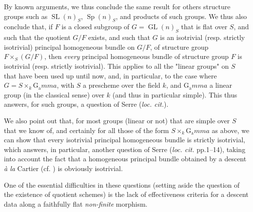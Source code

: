 By known arguments, we thus conclude the same result for others structure groups such as $\operatorname{SL}(n)_S$, $\operatorname{Sp}(n)_S$, and products of such groups.
We thus also conclude that, if $F$ is a closed subgroup of $G=\operatorname{GL}(n)_S$ that is flat over $S$, and such that the quotient $G/F$ exists, and such that $G$ is an isotrivial (resp. strictly isotrivial) principal homogeneous bundle on $G/F$, of structure group $F\times_S(G/F)$, then \emph{every} principal homogeneous bundle of structure group $F$ is isotrivial (resp. strictly isotrivial).
This applies to all the "linear groups" on $S$ that have been used up until now, and, in particular, to the case where $G=S\times_k\operatorname{G_a}mma$, with $S$ a prescheme over the field $k$, and $\operatorname{G_a}mma$ a linear group (in the classical sense) over $k$ (and thus in particular simple).
This thus answers, for such groups, a question of Serre (\emph{loc. cit.}).

We also point out that, for most groups (linear or not) that are simple over $S$ that we know of, and certainly for all those of the form $S\times_k\operatorname{G_a}mma$ as above, we can show that every isotrivial principal homogeneous bundle is strictly isotrivial, which answers, in particular, another question of Serre (\emph{loc. cit.} pp.1–14), taking into account the fact that a homogeneous principal bundle obtained by a descent \emph{à la} Cartier (cf. ) is obviously isotrivial.

\begin{remark}\label{fga3.i-b.6-remark}
    One of the essential difficulties in these questions (setting aside the question of the existence of quotient schemes) is the lack of effectiveness criteria for a descent data along a faithfully flat \emph{non-finite} morphism.
\end{remark}